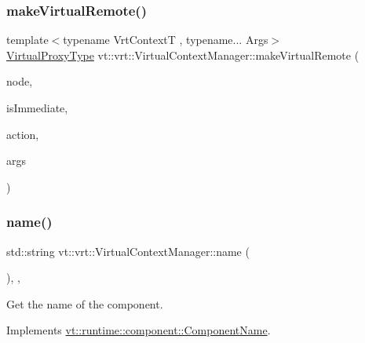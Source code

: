 \subsubsection{\texorpdfstring{make\+Virtual\+Remote()}{makeVirtualRemote()}}
{\footnotesize\ttfamily template$<$typename Vrt\+ContextT , typename... Args$>$ \\
\hyperlink{namespacevt_a1b417dd5d684f045bb58a0ede70045ac}{Virtual\+Proxy\+Type} vt\+::vrt\+::\+Virtual\+Context\+Manager\+::make\+Virtual\+Remote (\begin{DoxyParamCaption}\item[{\hyperlink{namespacevt_a866da9d0efc19c0a1ce79e9e492f47e2}{Node\+Type} const \&}]{node,  }\item[{bool}]{is\+Immediate,  }\item[{\hyperlink{namespacevt_a102aa105d64254d89f7e585d106c95aa}{Action\+Proxy\+Type}}]{action,  }\item[{Args \&\&...}]{args }\end{DoxyParamCaption})\hspace{0.3cm}{\ttfamily [private]}}

\mbox{\label{structvt_1_1vrt_1_1_virtual_context_manager_a56636a2609d203ef7eb3230af13ef7df}} 
\subsubsection{\texorpdfstring{name()}{name()}}
{\footnotesize\ttfamily std\+::string vt\+::vrt\+::\+Virtual\+Context\+Manager\+::name (\begin{DoxyParamCaption}{ }\end{DoxyParamCaption})\hspace{0.3cm}{\ttfamily [inline]}, {\ttfamily [override]}, {\ttfamily [virtual]}}



Get the name of the component. 



Implements \hyperlink{structvt_1_1runtime_1_1component_1_1_component_name_a33c06229bb605a2b2ceff68830d6d773}{vt\+::runtime\+::component\+::\+Component\+Name}.

\mbox{\label{structvt_1_1vrt_1_1_virtual_context_manager_ab79342508fe36427b54e3d94297e223a}} 
